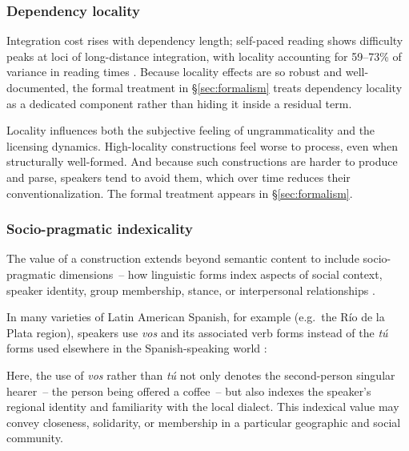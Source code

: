 \documentclass[12pt,letterpaper]{article}
\newcommand{\olang}[1]{\textit{#1}}
\begin{document}
\subsubsection{Dependency locality}\label{sec:dependency-locality}

Integration cost rises with dependency length; self-paced reading shows difficulty peaks at loci of long-distance integration, with locality accounting for 59--73\% of variance in reading times \autocite{GrodnerGibson2005}. Because locality effects are so robust and well-documented, the formal treatment in \S\ref{sec:formalism} treats dependency locality as a dedicated component rather than hiding it inside a residual term.

Locality influences both the subjective feeling of ungrammaticality and the licensing dynamics. High-locality constructions feel worse to process, even when structurally well-formed. And because such constructions are harder to produce and parse, speakers tend to avoid them, which over time reduces their conventionalization. The formal treatment appears in \S\ref{sec:formalism}.

\subsubsection{Socio-pragmatic indexicality}\label{sec:socio-indexical}

The value of a construction extends beyond semantic content to include socio-pragmatic dimensions~-- how linguistic forms index aspects of social context, speaker identity, group membership, stance, or interpersonal relationships \autocite{Eckert2012, Silverstein1976}.

In many varieties of Latin American Spanish, for example (e.g.\, the Río de la Plata region), speakers use \olang{vos} and its associated verb forms instead of the \olang{tú} forms used elsewhere in the Spanish-speaking world \autocite{bertolotti2016}:

\z

Here, the use of \olang{vos} rather than \olang{tú} not only denotes the second-person singular hearer~-- the person being offered a coffee~-- but also indexes the speaker's regional identity and familiarity with the local dialect. This indexical value may convey closeness, solidarity, or membership in a particular geographic and social community.
\end{document}
